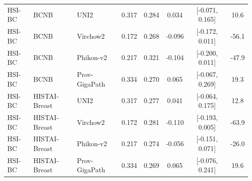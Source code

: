 \begin{table}[H]
{\begin{tabular}{l l l c c c c c}
HSI-BC & BCNB & UNI2 & 0.317 & 0.284 & 0.034 & [-0.071, 0.165] & 10.6 \\
HSI-BC & BCNB & Virchow2 & 0.172 & 0.268 & -0.096 & [-0.172, 0.011] & -56.1 \\
HSI-BC & BCNB & Phikon-v2 & 0.217 & 0.321 & -0.104 & [-0.200, 0.011] & -47.9 \\
HSI-BC & BCNB & Prov-GigaPath & 0.334 & 0.270 & 0.065 & [-0.067, 0.269] & 19.3 \\
\midrule
HSI-BC & HISTAI-Breast & UNI2 & 0.317 & 0.277 & 0.041 & [-0.064, 0.175] & 12.8 \\
HSI-BC & HISTAI-Breast & Virchow2 & 0.172 & 0.281 & -0.110 & [-0.193, 0.005] & -63.9 \\
HSI-BC & HISTAI-Breast & Phikon-v2 & 0.217 & 0.274 & -0.056 & [-0.151, 0.071] & -26.0 \\
HSI-BC & HISTAI-Breast & Prov-GigaPath & 0.334 & 0.269 & 0.065 & [-0.076, 0.241] & 19.6 \\
\midrule
\bottomrule
\end{tabular}
}
\end{table}

